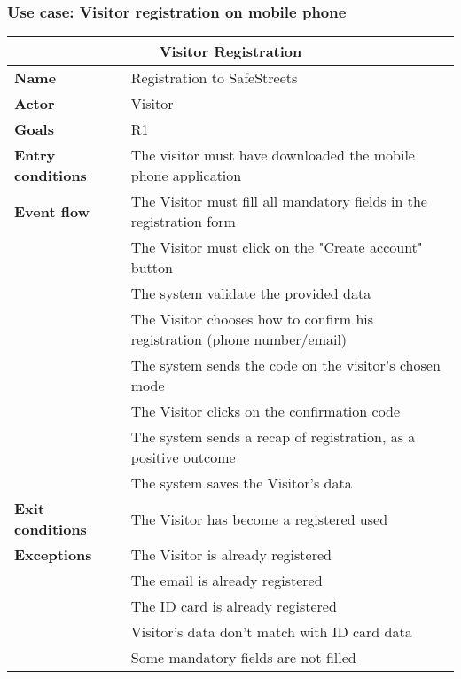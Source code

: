 \subsubsection{Use case: Visitor registration on mobile phone}
\begin{table}[h]
    \center
    \begin{tabular}{l|l}
        \multicolumn{2}{c}{\textbf{Visitor Registration}} \\
        \hline
        \textbf{Name} & Registration to SafeStreets \\
        \hline
        \textbf{Actor} & Visitor \\
        \hline
        \textbf{Goals} & R1 \\
        \hline
        \textbf{Entry conditions} & The visitor must have downloaded the mobile phone application \\
        \hline
        \textbf{Event flow} & The Visitor must fill all mandatory fields in the registration form \\ 
        & The Visitor must click on the "Create account" button \\ 
        & The system validate the provided data \\
        & The Visitor chooses how to confirm his registration (phone number/email) \\
        & The system sends the code on the visitor's chosen mode \\ 
        & The Visitor clicks on the confirmation code \\ 
        & The system sends a recap of registration, as a positive outcome \\
        & The system saves the Visitor's data \\
        \hline
        \textbf{Exit conditions} & The Visitor has become a registered used \\
        \hline
        \textbf{Exceptions}
        & The Visitor is already registered \\
        & The email is already registered \\
        & The ID card is already registered \\
        & Visitor's data don't match with ID card data \\
        & Some mandatory fields are not filled \\
        \hline
    \end{tabular}
\end{table}

